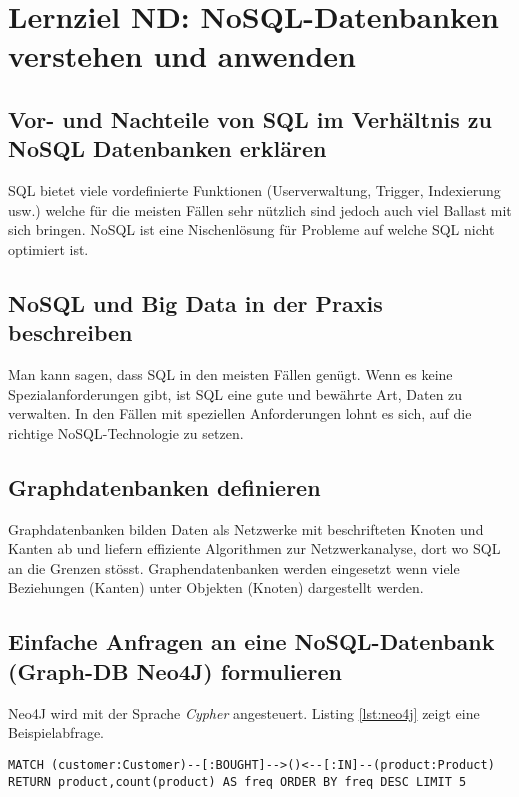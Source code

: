 \section{Lernziel ND: NoSQL-Datenbanken verstehen und anwenden}

\subsection{Vor- und Nachteile von SQL im Verhältnis zu NoSQL Datenbanken erklären}

SQL bietet viele vordefinierte Funktionen (Userverwaltung, Trigger, Indexierung usw.) welche für die meisten Fällen sehr nützlich sind jedoch auch viel Ballast mit sich bringen. NoSQL ist eine Nischenlösung für Probleme auf welche SQL nicht optimiert ist.

\subsection{NoSQL und Big Data in der Praxis beschreiben}

Man kann sagen, dass SQL in den meisten Fällen genügt. Wenn es keine Spezialanforderungen gibt, ist SQL eine gute und bewährte Art, Daten zu verwalten. In den Fällen mit speziellen Anforderungen lohnt es sich, auf die richtige NoSQL-Technologie zu setzen. 

\subsection{Graphdatenbanken definieren}

Graphdatenbanken bilden Daten als Netzwerke mit beschrifteten Knoten und Kanten ab und liefern effiziente Algorithmen zur Netzwerkanalyse, dort wo SQL an die Grenzen stösst. Graphendatenbanken werden eingesetzt wenn viele Beziehungen (Kanten) unter Objekten (Knoten) dargestellt werden.

\subsection{Einfache Anfragen an eine NoSQL-Datenbank (Graph-DB Neo4J) formulieren}

Neo4J wird mit der Sprache \emph{Cypher} angesteuert. Listing \ref{lst:neo4j} zeigt eine Beispielabfrage.

\begin{lstlisting}[caption={Beispielanfrage mit Cypher},label=lst:neo4j]
MATCH (customer:Customer)--[:BOUGHT]-->()<--[:IN]--(product:Product) RETURN product,count(product) AS freq ORDER BY freq DESC LIMIT 5
\end{lstlisting}